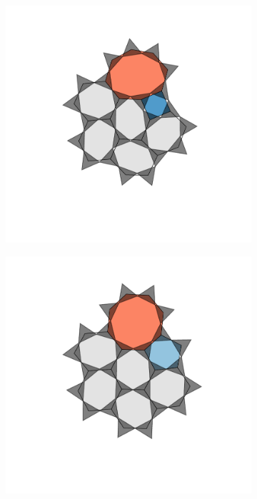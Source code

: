 \begin{figure}[bt]
     \vspace{2mm}
     
     \begin{subfigure}[b]{0.18\textwidth}
         \centering
         \includegraphics[width=\textwidth]{./figures/bilayers/alg_4.pdf}
         \caption{}
         \label{fig:triraftalgtrial1}
     \end{subfigure}
     \hfill
     \begin{subfigure}[b]{0.18\textwidth}
         \centering
         \includegraphics[width=\textwidth]{./figures/bilayers/alg_5.pdf}

\end{subfigure}
\end{figure}
